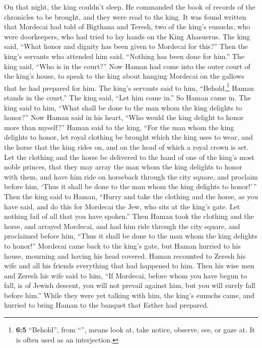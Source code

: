  On that night, the king couldn't sleep. He commanded the
book of records of the chronicles to be brought, and they were read to
the king.  It was found written that Mordecai had told of
Bigthana and Teresh, two of the king's eunuchs, who were doorkeepers,
who had tried to lay hands on the King Ahasuerus.  The
king said, ``What honor and dignity has been given to Mordecai for
this?'' Then the king's servants who attended him said, ``Nothing has
been done for him.''  The king said, ``Who is in the
court?'' Now Haman had come into the outer court of the king's house, to
speak to the king about hanging Mordecai on the gallows that he had
prepared for him.  The king's servants said to him,
``Behold,\footnote{\textbf{6:5} ``Behold'', from ``'', means
  look at, take notice, observe, see, or gaze at. It is often used as an
  interjection.} Haman stands in the court.'' The king said, ``Let him
come in.''  So Haman came in. The king said to him, ``What
shall be done to the man whom the king delights to honor?'' Now Haman
said in his heart, ``Who would the king delight to honor more than
myself?''  Haman said to the king, ``For the man whom the
king delights to honor,  let royal clothing be brought
which the king uses to wear, and the horse that the king rides on, and
on the head of which a royal crown is set.  Let the
clothing and the horse be delivered to the hand of one of the king's
most noble princes, that they may array the man whom the king delights
to honor with them, and have him ride on horseback through the city
square, and proclaim before him, `Thus it shall be done to the man whom
the king delights to honor!'\,''  Then the king said to
Haman, ``Hurry and take the clothing and the horse, as you have said,
and do this for Mordecai the Jew, who sits at the king's gate. Let
nothing fail of all that you have spoken.''  Then Haman
took the clothing and the horse, and arrayed Mordecai, and had him ride
through the city square, and proclaimed before him, ``Thus it shall be
done to the man whom the king delights to honor!'' 
Mordecai came back to the king's gate, but Haman hurried to his house,
mourning and having his head covered.  Haman recounted to
Zeresh his wife and all his friends everything that had happened to him.
Then his wise men and Zeresh his wife said to him, ``If Mordecai, before
whom you have begun to fall, is of Jewish descent, you will not prevail
against him, but you will surely fall before him.'' 
While they were yet talking with him, the king's eunuchs came, and
hurried to bring Haman to the banquet that Esther had prepared.

